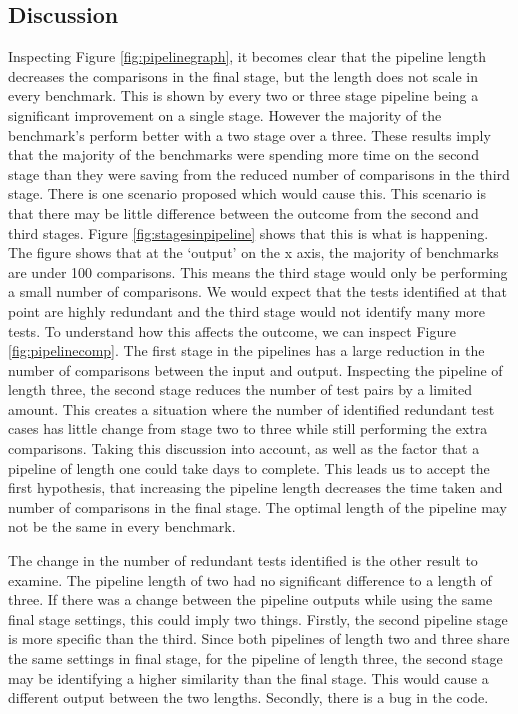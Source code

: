 \subsection{Discussion}

Inspecting Figure \ref{fig:pipelinegraph}, it becomes clear that the pipeline length decreases the comparisons in the final stage, but the length does not scale in every benchmark. This is shown by every two or three stage pipeline being a significant improvement on a single stage. However the majority of the benchmark's perform better with a two stage over a three. These results imply that the majority of the benchmarks were spending more time on the second stage than they were saving from the reduced number of comparisons in the third stage. There is one scenario proposed which would cause this. This scenario is that there may be little difference between the outcome from the second and third stages. Figure \ref{fig:stagesinpipeline} shows that this is what is happening. The figure shows that at the `output' on the x axis, the majority of benchmarks are under 100 comparisons. This means the third stage would only be performing a small number of comparisons. We would expect that the tests identified at that point are highly redundant and the third stage would not identify many more tests. To understand how this affects the outcome, we can inspect Figure \ref{fig:pipelinecomp}. The first stage in the pipelines has a large reduction in the number of comparisons between the input and output. Inspecting the pipeline of length three, the second stage reduces the number of test pairs by a limited amount. This creates a situation where the number of identified redundant test cases has little change from stage two to three while still performing the extra comparisons. Taking this discussion into account, as well as the factor that a pipeline of length one could take days to complete. This leads us to accept the first hypothesis, that increasing the pipeline length decreases the time taken and number of comparisons in the final stage. The optimal length of the pipeline may not be the same in every benchmark.

The change in the number of redundant tests identified is the other result to examine. The pipeline length of two had no significant difference to a length of three. If there was a change between the pipeline outputs while using the same final stage settings, this could imply two things. Firstly, the second pipeline stage is more specific than the third. Since both pipelines of length two and three share the same settings in final stage, for the pipeline of length three, the second stage may be identifying a higher similarity than the final stage. This would cause a different output between the two lengths. Secondly, there is a bug in the code.

